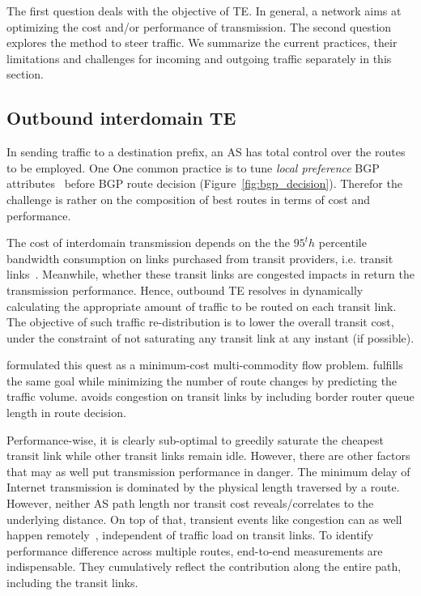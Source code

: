 The first question deals with the objective of \ac{TE}. In general, a network aims at optimizing the cost and/or performance of transmission.
The second question explores the method to steer traffic.
We summarize the current practices, their limitations and challenges for incoming and outgoing traffic separately in this section.

\subsection{Outbound interdomain TE}
In sending traffic to a destination prefix, an AS has total control over the routes to be employed. One One common practice is to tune \textit{local preference} BGP attributes~\cite{Wang2008} before BGP route decision (Figure~\ref{fig:bgp_decision}). 
Therefor the challenge is rather on the composition of best routes in terms of cost and performance.

The cost of interdomain transmission depends on the the $95^th$ percentile bandwidth consumption on links purchased from transit providers, i.e. transit links~\cite{drpeering-95th}.
Meanwhile, whether these transit links are congested impacts in return the transmission performance.
Hence, outbound TE resolves in dynamically calculating the appropriate amount of traffic to be routed on each transit link.
The objective of such traffic re-distribution is to lower the overall transit cost, under the constraint of not saturating any transit link at any instant (if possible).

\citet{Goldenberg2004} formulated this quest as a minimum-cost multi-commodity flow problem.
\citet{Uhlig2004b} fulfills the same goal while minimizing the number of route changes by predicting the traffic volume.
\citet{Zhu2014} avoids congestion on transit links by including border router queue length in route decision.

Performance-wise, it is clearly sub-optimal to greedily saturate the cheapest transit link while other transit links remain idle.
However, there are other factors that may as well put transmission performance in danger.
The minimum delay of Internet transmission is dominated by the physical length traversed by a route. 
However, neither AS path length nor transit cost reveals/correlates to the underlying distance.
On top of that, transient events like congestion can as well happen remotely~\cite{Akella2003, Luckie2014}, independent of traffic load on transit links.
To identify performance difference across multiple routes, end-to-end measurements are indispensable.
They cumulatively reflect the contribution along the entire path, including the transit links.


